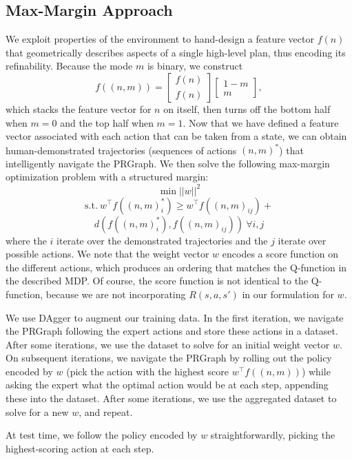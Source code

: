 \subsection{Max-Margin Approach}
We exploit properties of the environment to hand-design a feature vector $f(n)$ that geometrically
describes aspects of a single high-level plan, thus encoding its refinability. Because the mode $m$ is binary,
we construct $$f((n, m)) = \begin{bmatrix} f(n) \\ f(n) \end{bmatrix} \begin{bmatrix} 1 - m \\ m \end{bmatrix},$$
which stacks the feature vector for $n$ on itself, then turns off the bottom half when $m = 0$ and the
top half when $m = 1$. Now that we have defined a feature vector associated with each action that can be taken
from a state, we can obtain human-demonstrated trajectories (sequences of actions $(n, m)^{*}$) that intelligently
navigate the PRGraph. We then solve the following max-margin optimization problem with a structured margin:
$$\min ||w||^{2}$$
$$\text{s.t.}\ w^{\top}f((n, m)_{i}^{*}) \geq w^{\top}f((n, m)_{ij}) + $$
$$d(f((n, m)_{i}^{*}), f((n, m)_{ij}))\ \forall i, j$$
where the $i$ iterate over the demonstrated trajectories and the $j$ iterate over possible actions.
We note that the weight vector $w$ encodes a score function on the different actions, which produces
an ordering that matches the Q-function in the described MDP. Of course, the score function is not identical
to the Q-function, because we are not incorporating $R(s, a, s')$ in our formulation for $w$.

We use DAgger to augment our training data. In the first iteration, we navigate the PRGraph following
the expert actions and store these actions in a dataset. After some iterations, we use the dataset to solve for an
initial weight vector $w$. On subsequent iterations, we navigate the PRGraph by rolling out the policy
encoded by $w$ (pick the action with the highest score $w^{\top}f((n, m))$) while asking the expert what
the optimal action would be at each step, appending these into the dataset. After some iterations, we use the
aggregated dataset to solve for a new $w$, and repeat.

At test time, we follow the policy encoded by $w$ straightforwardly, picking the highest-scoring action
at each step.